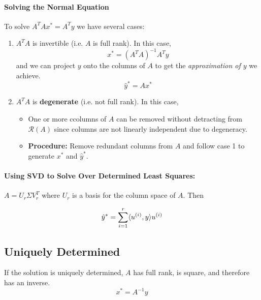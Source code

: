 \documentclass[a4paper,12pt]{report}
\DeclarePairedDelimiter\inpr{\langle}{\rangle}%
\begin{document}
\paragraph{Solving the Normal Equation} 

To solve $A^T A x^* = A^T y$ we have several cases:

\begin{enumerate}
\item $A^T A$ is invertible (i.e. $A$ is full rank). In this case, 
\begin{equation}
x^* = (A^T A)^{-1} A^T y
\end{equation}
and we can project $y$ onto the columns of $A$ to get the \textit{approximation of $y$} we achieve.
\begin{equation}
\hat y^* = A x^*
\end{equation}

\item $A^T A$ is \textbf{degenerate} (i.e. not full rank). In this case,
\begin{itemize}
\item One or more ccolumns of $A$ can be removed without detracting from $\mathcal{R}(A)$ since columns are not linearly independent due to degeneracy.
\item \textbf{Procedure:} Remove redundant columns from $A$ and follow case 1 to generate $x^*$ and $\hat y^*$.
\end{itemize}
\end{enumerate}

\paragraph{Using SVD to Solve Over Determined Least Squares: } $A = U_r \Sigma V_r^T$ where $U_r$ is a basis for the column space of $A$. Then

\begin{equation}
\hat y^* = \sum_{i=1}^{r} \inpr{u^{(i)}, y} u^{(i)} 
\end{equation}

\subsection{Uniquely Determined}

If the solution is uniquely determined, $A$ has full rank, is square, and therefore has an inverse. 
\begin{equation}
x^* = A^{-1} y
\end{equation}
\end{document}
